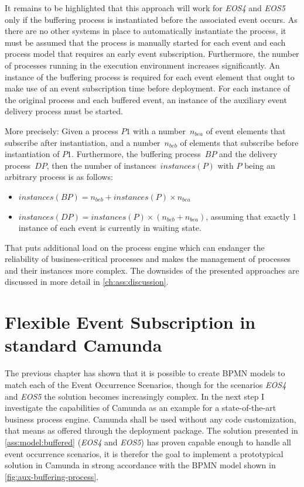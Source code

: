 It remains to be highlighted that this approach will work for \textit{EOS4} and \textit{EOS5} only if the buffering process is instantiated before the associated event occurs. As there are no other systems in place to automatically instantiate the process, it must be assumed that the process is manually started for each event and each process model that requires an early event subscription.
Furthermore, the number of processes running in the execution environment increases significantly. An instance of the buffering process is required for each event element that ought to make use of an event subscription time before deployment. For each instance of the original process and each buffered event, an instance of the auxiliary event delivery process must be started.

\medskip \noindent
More precisely: Given a process $P1$ with a number~$n_{bea}$ of event elements that subscribe after instantiation, and a number~$n_{beb}$ of elements that subscribe before instantiation of $P1$. Furthermore, the buffering process~$BP$ and the delivery process~$DP$, then the number of instances~$instances(P)$ with $P$ being an arbitrary process is as follows:

\begin{itemize}
	\item $instances(BP) = n_{beb} + instances(P) \times n_{bea} $
	\item $instances(DP) = instances(P) \times (n_{beb} + n_{bea})$, assuming that exactly 1 instance of each event is currently in waiting state.
\end{itemize}

\noindent That puts additional load on the process engine which can endanger the reliability of business-critical processes and makes the management of processes and their instances more complex.
The downsides of the presented approaches are discussed in more detail in \autoref{ch:ass:discussion}.


\section{Flexible Event Subscription in standard Camunda}\label{ch:assessment-implementation}
The previous chapter has shown that it is possible to create BPMN models to match each of the Event Occurrence Scenarios, though for the scenarios \textit{EOS4} and \textit{EOS5} the solution becomes increasingly complex.
In the next step I investigate the capabilities of Camunda as an example for a state-of-the-art business process engine.
Camunda shall be used without any code customization, that means as offered through the deployment package.
The solution presented in \autoref{ass:model:buffered} (\textit{EOS4} and \textit{EOS5}) has proven capable enough to handle all event occurrence scenarios, it is therefor the goal to implement a prototypical solution in Camunda in strong accordance with the BPMN model shown in \autoref{fig:aux-buffering-process}.

